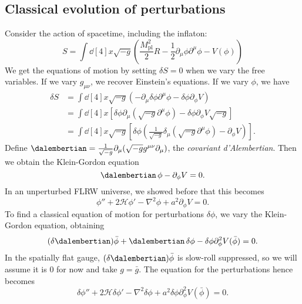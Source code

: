\documentclass{jknotes}
\begin{document}
\subsection{Classical evolution of perturbations}
Consider the action of spacetime, including the inflaton:
\begin{equation}
    S = \int\dd[4]{x} \sqrt{-g}\left(\frac{M_{\text{pl}}^2}2 R - \frac12 \partial_\mu\phi\partial^\mu\phi - V(\phi)\right)
\end{equation}
We get the equations of motion by setting \(\delta S = 0\) when we vary the free variables. If we vary \(g_{\mu\nu}\), we recover Einstein's equations. If we vary \(\phi\), we have
\begin{align}
    \delta S &= \int\dd[4]{x}\sqrt{-g}\left(-\partial_\mu\delta\phi\partial^\mu\phi - \delta\phi\partial_\phi V\right) \\
             &= \int\dd[4]{x} \left[\delta\phi\partial_\mu\left(\sqrt{-g}\partial^\mu\phi\right) - \delta\phi \partial_\phi V \sqrt{-g}\right] \\
             &= \int\dd[4]{x} \sqrt{-g}\left[\delta\phi\left(\frac1{\sqrt{-g}}\delta_\mu\left(\sqrt{-g}\partial^\mu\phi\right)-\partial_\phi V\right)\right].
\end{align}
Define \(\dalembertian = \frac1{\sqrt{-g}}\partial_\mu(\sqrt{-g}g^{\mu\nu}\partial_\mu)\), the \emph{covariant d'Alembertian}. Then we obtain the Klein-Gordon equation
\begin{equation}
    \dalembertian\,\phi - \partial_\phi V = 0.
\end{equation}
In an unperturbed FLRW universe, we showed before that this becomes
\begin{equation}
    \phi'' + 2\mathcal{H}\phi' - \nabla^2\phi + a^2\partial_\phi V = 0.
\end{equation}
To find a classical equation of motion for perturbations \(\delta\phi\), we vary the Klein-Gordon equation, obtaining
\begin{equation}
    (\delta\dalembertian)\bar\phi + \dalembertian\,\delta\phi - \delta\phi\partial^2_\phi V(\bar{\phi}) = 0.
\end{equation}
In the spatially flat gauge, \((\delta\dalembertian)\bar\phi\) is slow-roll suppressed, so we will assume it is 0 for now and take \(g = \bar{g}\). The equation for the perturbations hence becomes
\begin{equation}
    \delta\phi'' + 2\mathcal{H}\delta\phi' - \nabla^2\delta\phi + a^2\delta\phi\partial^2_\phi V(\bar\phi) = 0.
\end{equation}
\end{document}
